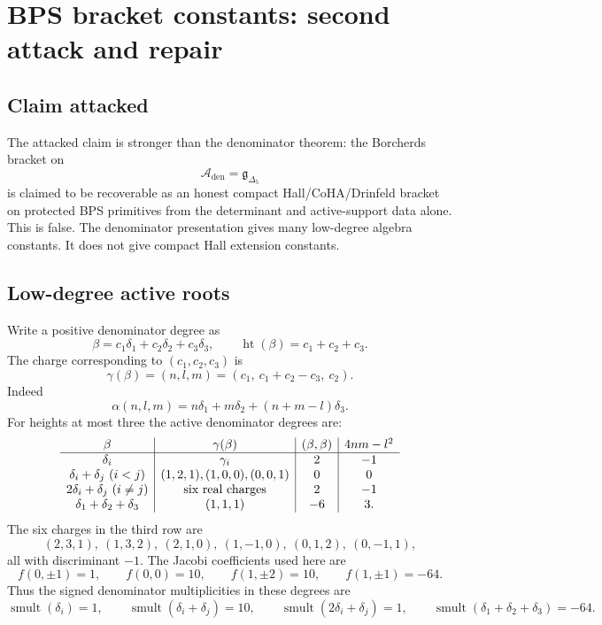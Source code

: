 \section{BPS bracket constants: second attack and repair}
\label{sec:bps-bracket-constants-attack-heal}

\providecommand{\Z}{\mathbb Z}
\providecommand{\C}{\mathbb C}
\providecommand{\R}{\mathbb R}
\providecommand{\La}{\Lambda}
\providecommand{\autcor}{\mathfrak g_{\Delta_5}}
\providecommand{\sdim}{\operatorname{sdim}}
\providecommand{\smult}{\operatorname{smult}}
\providecommand{\Prim}{\operatorname{Prim}}

\subsection{Claim attacked}

The attacked claim is stronger than the denominator theorem:
the Borcherds bracket on
$$
\mathcal A_{\mathrm{den}}=\autcor
$$
is claimed to be recoverable as an honest compact
Hall/CoHA/Drinfeld bracket on protected BPS primitives from the
determinant and active-support data alone.  This is false.  The
denominator presentation gives many low-degree algebra constants.  It
does not give compact Hall extension constants.

\subsection{Low-degree active roots}

Write a positive denominator degree as
$$
\beta=c_1\delta_1+c_2\delta_2+c_3\delta_3,\qquad
\operatorname{ht}(\beta)=c_1+c_2+c_3.
$$
The charge corresponding to \((c_1,c_2,c_3)\) is
$$
\gamma(\beta)=(n,l,m)=(c_1,\ c_1+c_2-c_3,\ c_2).
$$
Indeed
$$
\alpha(n,l,m)=n\delta_1+m\delta_2+(n+m-l)\delta_3.
$$
For heights at most three the active denominator degrees are:
$$
\begin{array}{c|c|c|c}
\beta & \gamma(\beta) & (\beta,\beta) & 4nm-l^2\\
\hline
\delta_i & \gamma_i & 2 & -1\\
\delta_i+\delta_j\ (i<j) & (1,2,1),(1,0,0),(0,0,1) & 0 & 0\\
2\delta_i+\delta_j\ (i\neq j) & \hbox{six real charges} & 2 & -1\\
\delta_1+\delta_2+\delta_3 & (1,1,1) & -6 & 3 .
\end{array}
$$
The six charges in the third row are
$$
(2,3,1),\ (1,3,2),\ (2,1,0),\ (1,-1,0),\
(0,1,2),\ (0,-1,1),
$$
all with discriminant \(-1\).  The Jacobi coefficients used here are
$$
f(0,\pm1)=1,\qquad f(0,0)=10,\qquad
f(1,\pm2)=10,\qquad f(1,\pm1)=-64.
$$
Thus the signed denominator multiplicities in these degrees are
$$
\smult(\delta_i)=1,\qquad
\smult(\delta_i+\delta_j)=10,\qquad
\smult(2\delta_i+\delta_j)=1,\qquad
\smult(\delta_1+\delta_2+\delta_3)=-64.
$$

